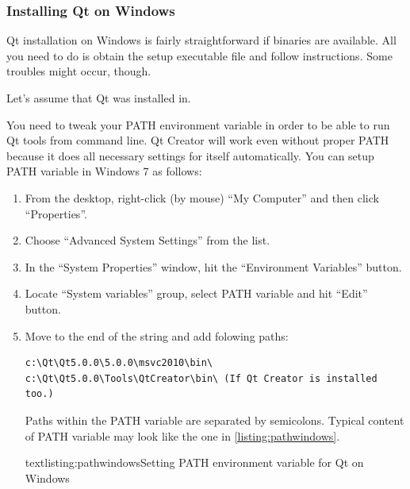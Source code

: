\subsubsection{Installing Qt on Windows}
Qt installation on Windows is fairly straightforward if binaries are available. All you need to do is obtain the setup executable file and follow instructions. Some troubles might occur, though.

Let's assume that Qt was installed in.

You need to tweak your PATH environment variable in order to be able to run Qt tools from command line. Qt Creator will work even without proper PATH because it does all necessary settings for itself automatically. You can setup PATH variable in Windows 7 as follows:
\begin{enumerate}
\item From the desktop, right-click (by mouse) \enquote{My Computer} and then click \enquote{Properties}.
\item Choose \enquote{Advanced System Settings} from the list.
\item In the \enquote{System Properties} window, hit the \enquote{Environment Variables} button.
\item Locate \enquote{System variables} group, select PATH variable and hit \enquote{Edit} button.
\item Move to the end of the string and add folowing paths:
\begin{lstlisting}[firstnumber=1,language=text]
c:\Qt\Qt5.0.0\5.0.0\msvc2010\bin\
c:\Qt\Qt5.0.0\Tools\QtCreator\bin\ (If Qt Creator is installed too.)
\end{lstlisting}
Paths within the PATH variable are separated by semicolons. Typical content of PATH variable may look like the one in \autoref{listing:pathwindows}.
\begin{fdoccode}{text}{listing:pathwindows}{Setting PATH environment variable for Qt on Windows}
\end{fdoccode}
\end{enumerate}

